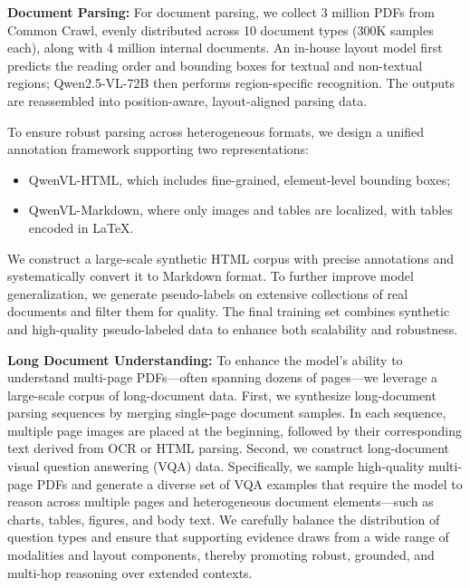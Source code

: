 \documentclass{article} %
\begin{document}
 \textbf{Document Parsing:}
 For document parsing, we collect 3 million PDFs from Common Crawl, evenly distributed across 10 document types (300K samples each), along with 4 million internal documents. An in-house layout model first predicts the reading order and bounding boxes for textual and non-textual regions; Qwen2.5-VL-72B then performs region-specific recognition. The outputs are reassembled into position-aware, layout-aligned parsing data.

To ensure robust parsing across heterogeneous formats, we design a unified annotation framework supporting two representations:
\begin{itemize}[itemindent=0pt, labelsep=4pt, leftmargin=*]
    \item QwenVL-HTML, which includes fine-grained, element-level bounding boxes;
    \item QwenVL-Markdown, where only images and tables are localized, with tables encoded in LaTeX.
\end{itemize}
We construct a large-scale synthetic HTML corpus with precise annotations and systematically convert it to Markdown format. To further improve model generalization, we generate pseudo-labels on extensive collections of real documents and filter them for quality. The final training set combines synthetic and high-quality pseudo-labeled data to enhance both scalability and robustness.

\textbf{Long Document Understanding:} 
To enhance the model’s ability to understand multi-page PDFs—often spanning dozens of pages—we leverage a large-scale corpus of long-document data.
First, we synthesize long-document parsing sequences by merging single-page document samples. In each sequence, multiple page images are placed at the beginning, followed by their corresponding text derived from OCR or HTML parsing.
Second, we construct long-document visual question answering (VQA) data. Specifically, we sample high-quality multi-page PDFs and generate a diverse set of VQA examples that require the model to reason across multiple pages and heterogeneous document elements—such as charts, tables, figures, and body text.
We carefully balance the distribution of question types and ensure that supporting evidence draws from a wide range of modalities and layout components, thereby promoting robust, grounded, and multi-hop reasoning over extended contexts.
\end{document}
